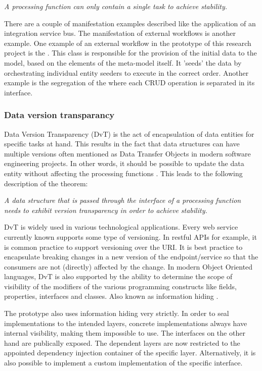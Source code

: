 \textit{A processing function can only contain a single task to achieve stability.}

There are a couple of manifestation examples described like the application of
an integration service bus. The manifestation of external workflows is another example.
One example of an external workflow in the prototype of this research project is the
. This class is responsible for
the provision of the initial data to the model, based on the elements of the meta-model
itself. It 'seeds' the data by orchestrating individual entity seeders to execute in the
correct order. Another example is the segregation of the 
where each CRUD operation is separated in its interface. 

\subsubsection{Data version transparancy}
Data Version Transparency (DvT) is the act of encapsulation of data entities for specific
tasks at hand. This results in the fact that data structures can have multiple versions
often mentioned as Data Transfer Objects in modern software engineering projects. In other
words, it should be possible to update the data entity without affecting the processing
functions \parencite{mannaert_normalized_2016}. This leads to the following description of
the theorem:

\textit{A data structure that is passed through the interface of a processing
function needs to exhibit version transparency in order to achieve stability.}

DvT is widely used in various technological applications. Every web service currently known
supports some type of versioning. In restful APIs for example, it is common practice to
support versioning over the URI. It is best practice to encapsulate breaking changes in a
new version of the endpoint/service so that the consumers are not (directly) affected by
the change. In modern Object Oriented languages, DvT is also supported by the ability to
determine the scope of visibility of the modifiers of the various programming constructs
like fields, properties, interfaces and classes. Also known as information hiding
\parencite{parnas_criteria_1972, mannaert_normalized_2016}.

The prototype also uses information hiding very strictly. In order to seal implementations
to the intended layers, concrete implementations always have internal visibility, making
them impossible to use. The interfaces on the other hand are publically exposed. The
dependent layers are now restricted to the appointed dependency injection container of the
specific layer. Alternatively, it is also possible to implement a custom implementation of
the specific interface. 

